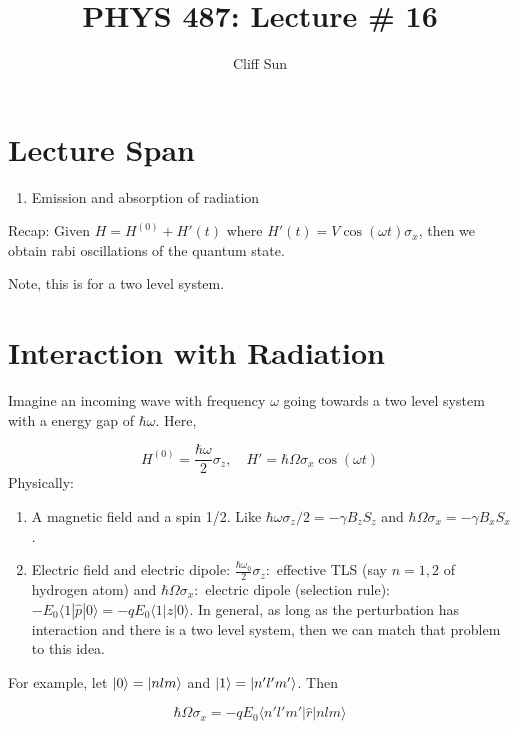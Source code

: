 \documentclass{article}
\title{PHYS 487: Lecture \# 16}
\author{Cliff Sun}
\newtheorem{one minute paper}[theorem]{One Minute Paper}
\begin{document}
\maketitle

\section*{Lecture Span}
\begin{enumerate}
    \item Emission and absorption of radiation
\end{enumerate}

Recap: Given $H = H^{(0)} + H'(t)$ where $H'(t) = V\cos(\omega t)\sigma_x$, then we obtain rabi oscillations of the quantum state.

Note, this is for a two level system. 

\section*{Interaction with Radiation}

Imagine an incoming wave with frequency $\omega$ going towards a two level system with a energy gap of $\hbar \omega$. Here, 

\begin{equation}
    H^{(0)} = \frac{\hbar\omega}{2}\sigma_z, \quad H' = \hbar \Omega \sigma_x \cos(\omega t)
\end{equation}
Physically:
\begin{enumerate}
    \item A magnetic field and a spin 1/2. Like $\hbar \omega \sigma_z / 2 = -\gamma B_z S_z$ and $\hbar \Omega \sigma_x = -\gamma B_x S_x$.
    \item Electric field and electric dipole: $\frac{\hbar \omega_0}{2}\sigma_z:$ effective TLS (say $n=1, 2$ of hydrogen atom) and $\hbar \Omega \sigma_x:$ electric dipole (selection rule): $-E_0\langle 1 | \hat{p} |0 \rangle = -qE_0 \langle 1 | z | 0 \rangle$. In general, as long as the perturbation has interaction and there is a two level system, then we can match that problem to this idea.  
\end{enumerate}  

For example, let $\ket{0} = \ket{nlm}$ and $\ket{1} = \ket{n'l'm'}$. Then 

\begin{equation}
    \hbar \Omega \sigma_x = -qE_0 \langle n'l'm' | \hat{r} | nlm \rangle
\end{equation}
\end{document}
